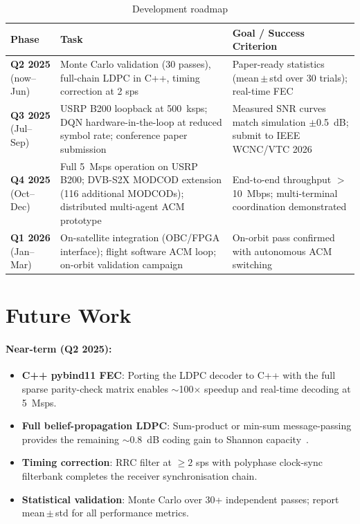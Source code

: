 \documentclass[12pt,a4paper]{report}
\begin{document}
\begin{table}[H]
\centering
\caption{Development roadmap}
\label{tab:roadmap}
\begin{tabular}{p{2.8cm}p{5.2cm}p{4.5cm}}
\toprule
\textbf{Phase} & \textbf{Task} & \textbf{Goal / Success Criterion} \\
\midrule
\textbf{Q2 2025} \newline (now--Jun) &
  Monte Carlo validation (30 passes), full-chain LDPC in C++, timing correction
  at 2 sps &
  Paper-ready statistics (mean\,$\pm$\,std over 30 trials); real-time FEC \\
\midrule
\textbf{Q3 2025} \newline (Jul--Sep) &
  USRP B200 loopback at 500~ksps; DQN hardware-in-the-loop at reduced symbol
  rate; conference paper submission &
  Measured SNR curves match simulation $\pm$0.5~dB;
  submit to IEEE WCNC/VTC 2026 \\
\midrule
\textbf{Q4 2025} \newline (Oct--Dec) &
  Full 5~Msps operation on USRP B200; DVB-S2X MODCOD extension (116 additional
  MODCODs); distributed multi-agent ACM prototype &
  End-to-end throughput $>$10~Mbps; multi-terminal coordination demonstrated \\
\midrule
\textbf{Q1 2026} \newline (Jan--Mar) &
  On-satellite integration (OBC/FPGA interface); flight software ACM loop;
  on-orbit validation campaign &
  On-orbit pass confirmed with autonomous ACM switching \\
\bottomrule
\end{tabular}
\end{table}

\section{Future Work}

\paragraph{Near-term (Q2 2025):}
\begin{itemize}[nosep]
    \item \textbf{C++ pybind11 FEC}: Porting the LDPC decoder to C++ with the
          full sparse parity-check matrix enables $\sim$100$\times$ speedup and
          real-time decoding at 5~Msps.
    \item \textbf{Full belief-propagation LDPC}: Sum-product or min-sum
          message-passing provides the remaining $\sim$0.8~dB coding gain
          to Shannon capacity~\cite{etsi_dvbs2}.
    \item \textbf{Timing correction}: RRC filter at $\geq 2$ sps with polyphase
          clock-sync filterbank completes the receiver synchronisation chain.
    \item \textbf{Statistical validation}: Monte Carlo over 30+ independent
          passes; report mean\,$\pm$\,std for all performance metrics.
\end{itemize}
\end{document}
